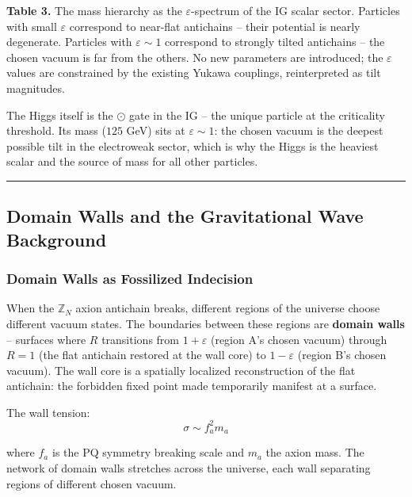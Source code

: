 \textbf{Table 3.} The mass hierarchy as the \(\varepsilon\)-spectrum of
the IG scalar sector. Particles with small \(\varepsilon\) correspond to
near-flat antichains -- their potential is nearly degenerate. Particles
with \(\varepsilon \sim 1\) correspond to strongly tilted antichains --
the chosen vacuum is far from the others. No new parameters are
introduced; the \(\varepsilon\) values are constrained by the existing
Yukawa couplings, reinterpreted as tilt magnitudes.

The Higgs itself is the \(\odot\) gate in the IG -- the unique particle
at the criticality threshold. Its mass (\(125\) GeV) sits at
\(\varepsilon \sim 1\): the chosen vacuum is the deepest possible tilt
in the electroweak sector, which is why the Higgs is the heaviest scalar
and the source of mass for all other particles.

\begin{center}\rule{0.5\linewidth}{0.5pt}\end{center}

\hypertarget{domain-walls-and-the-gravitational-wave-background}{%
\subsection{Domain Walls and the Gravitational Wave
Background}\label{domain-walls-and-the-gravitational-wave-background}}

\hypertarget{domain-walls-as-fossilized-indecision}{%
\subsubsection{Domain Walls as Fossilized
Indecision}\label{domain-walls-as-fossilized-indecision}}

When the \(\mathbb{Z}_N\) axion antichain breaks, different regions of
the universe choose different vacuum states. The boundaries between
these regions are \textbf{domain walls} -- surfaces where \(R\)
transitions from \(1 + \varepsilon\) (region A's chosen vacuum) through
\(R = 1\) (the flat antichain restored at the wall core) to
\(1 - \varepsilon\) (region B's chosen vacuum). The wall core is a
spatially localized reconstruction of the flat antichain: the forbidden
fixed point made temporarily manifest at a surface.

The wall tension: \[\sigma \sim f_a^2 m_a\]

where \(f_a\) is the PQ symmetry breaking scale and \(m_a\) the axion
mass. The network of domain walls stretches across the universe, each
wall separating regions of different chosen vacuum.

